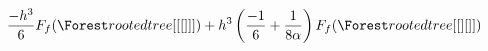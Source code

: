 \documentclass[
  preview,
  border={0pt 1pt 0pt 1pt}, %
]{standalone}
\begin{document}
\(\displaystyle
\frac{ - h^{3}}{6} F_{f}\mathopen{}\left( \rootedtree[[[]]] \right)\mathclose{} + h^{3} \left( \frac{-1}{6} + \frac{1}{8 \alpha} \right) F_{f}\mathopen{}\left( \rootedtree[[][]] \right)\mathclose{}
\)
\end{document}
